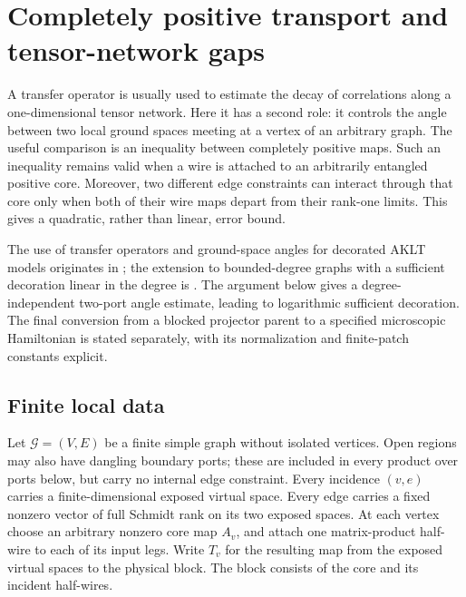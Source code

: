
\section{Completely positive transport and tensor-network gaps}
\label{q:sec-networks}

A transfer operator is usually used to estimate the decay of correlations
along a one-dimensional tensor network.  Here it has a second role: it
controls the angle between two local ground spaces meeting at a vertex
of an arbitrary graph.  The useful comparison is an inequality between
completely positive maps.  Such an inequality remains valid when a wire
is attached to an arbitrarily entangled positive core.  Moreover, two
different edge constraints can interact through that core only when both
of their wire maps depart from their rank-one limits.  This gives a
quadratic, rather than linear, error bound.

The use of transfer operators and ground-space angles for decorated
AKLT models originates in \cite{q:ARLLNY2020}; the extension to bounded-degree
graphs with a sufficient decoration linear in the degree is
\cite{LuciaYoung2023}.  The argument below gives a degree-independent
two-port angle estimate, leading to logarithmic sufficient decoration.
The final conversion from a blocked projector parent to a specified
microscopic Hamiltonian is stated separately, with its normalization
and finite-patch constants explicit.

\subsection{Finite local data}

Let $\mathcal G=(V,E)$ be a finite simple graph without isolated
vertices.  Open regions may also have dangling boundary ports; these
are included in every product over ports below, but carry no internal
edge constraint.  Every incidence $(v,e)$ carries a finite-dimensional exposed
virtual space.  Every edge carries a fixed nonzero vector of full Schmidt
rank on its two exposed spaces.  At each vertex choose an arbitrary
nonzero core map $A_v$, and attach one matrix-product half-wire to
each of its input legs.  Write $T_v$ for the resulting map from the
exposed virtual spaces to the physical block.  The block consists of
the core and its incident half-wires.

